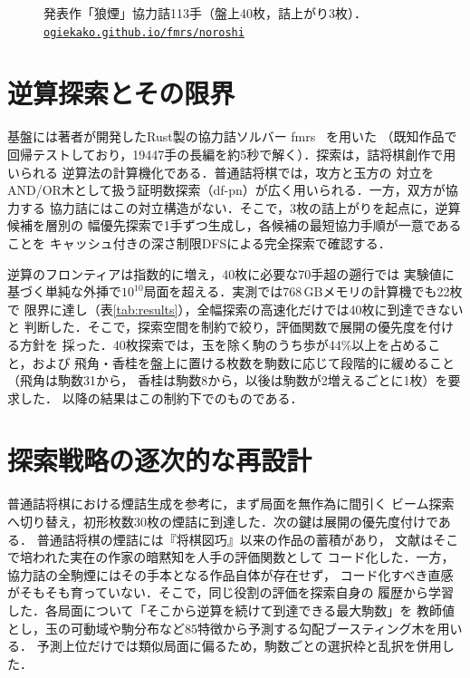 \documentclass[10pt,a4paper,twocolumn]{ltjsarticle}
\newcommand{\weburl}[1]{\href{https://#1}{\nolinkurl{#1}}}
\begin{document}
\begin{figure}[t]
\centering

\caption{発表作「狼煙」協力詰113手（盤上40枚，詰上がり3枚）．
\weburl{ogiekako.github.io/fmrs/noroshi}}
\label{fig:noroshi}
\end{figure}

\section{逆算探索とその限界}

基盤には著者が開発したRust製の協力詰ソルバー fmrs~\cite{fmrs} を用いた
（既知作品で回帰テストしており，19447手の長編を約5秒で解く）．探索は，詰将棋創作で用いられる
逆算法\cite{hirose1998,hirose2026}の計算機化である．普通詰将棋では，攻方と玉方の
対立をAND/OR木として扱う証明数探索（df-pn）が広く用いられる．一方，双方が協力する
協力詰にはこの対立構造がない．そこで，3枚の詰上がりを起点に，逆算候補を層別の
幅優先探索で1手ずつ生成し，各候補の最短協力手順が一意であることを
キャッシュ付きの深さ制限DFSによる完全探索で確認する．

逆算のフロンティアは指数的に増え，40枚に必要な70手超の遡行では
実験値に基づく単純な外挿で$10^{10}$局面を超える．実測では768\,GBメモリの計算機でも22枚で
限界に達し（表\ref{tab:results}），全幅探索の高速化だけでは40枚に到達できないと
判断した．そこで，探索空間を制約で絞り，評価関数で展開の優先度を付ける方針を
採った．40枚探索では，玉を除く駒のうち歩が44\%以上を占めること，および
飛角・香桂を盤上に置ける枚数を駒数に応じて段階的に緩めること（飛角は駒数31から，
香桂は駒数8から，以後は駒数が2増えるごとに1枚）を要求した．
以降の結果はこの制約下でのものである．

\section{探索戦略の逐次的な再設計}

普通詰将棋における煙詰生成\cite{hirose2026}を参考に，まず局面を無作為に間引く
ビーム探索へ切り替え，初形枚数30枚の煙詰に到達した．次の鍵は展開の優先度付けである．
普通詰将棋の煙詰には『将棋図巧』以来の作品の蓄積があり，
文献\cite{hirose2026}はそこで培われた実在の作家の暗黙知を人手の評価関数として
コード化した．一方，協力詰の全駒煙にはその手本となる作品自体が存在せず，
コード化すべき直感がそもそも育っていない．そこで，同じ役割の評価を探索自身の
履歴から学習した．各局面について「そこから逆算を続けて到達できる最大駒数」を
教師値とし，玉の可動域や駒分布など85特徴から予測する勾配ブースティング木を用いる．
予測上位だけでは類似局面に偏るため，駒数ごとの選択枠と乱択を併用した．
\end{document}
